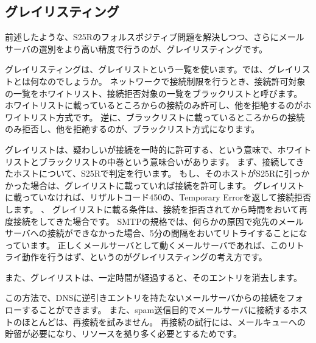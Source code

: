 \subsection{グレイリスティング}

前述したような、S25Rのフォルスポジティブ問題を解決しつつ、さらにメールサーバの選別をより高い精度で行うのが、グレイリスティングです。

グレイリスティングは、グレイリストという一覧を使います。では、グレイリストとは何なのでしょうか。
ネットワークで接続制限を行うとき、接続許可対象の一覧をホワイトリスト、接続拒否対象の一覧をブラックリストと呼びます。
ホワイトリストに載っているところからの接続のみ許可し、他を拒絶するのがホワイトリスト方式です。
逆に、ブラックリストに載っているところからの接続のみ拒否し、他を拒絶するのが、ブラックリスト方式になります。

グレイリストは、疑わしいが接続を一時的に許可する、という意味で、ホワイトリストとブラックリストの中巻という意味合いがあります。
まず、接続してきたホストについて、S25Rで判定を行います。
もし、そのホストがS25Rに引っかかった場合は、グレイリストに載っていれば接続を許可します。
グレイリストに載っていなければ、リザルトコード450の、Temporary Errorを返して接続拒否します。
、
グレイリストに載る条件は、接続を拒否されてから時間をおいて再度接続をしてきた場合です。
SMTPの規格では、何らかの原因で宛先のメールサーバへの接続ができなかった場合、5分の間隔をおいてリトライすることになっています。
正しくメールサーバとして動くメールサーバであれば、このリトライ動作を行うはず、というのがグレイリスティングの考え方です。

また、グレイリストは、一定時間が経過すると、そのエントリを消去します。

この方法で、DNSに逆引きエントリを持たないメールサーバからの接続をフォローすることができます。
また、spam送信目的でメールサーバに接続するホストのほとんどは、再接続を試みません。
再接続の試行には、メールキューへの貯留が必要になり、リソースを拠り多く必要とするためです。


